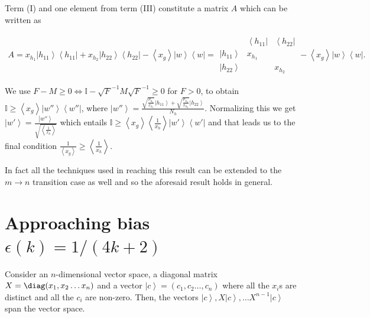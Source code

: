 \documentclass{article}
\begin{document}
Term (I) and one element from term (III) constitute a
matrix $A$ which can be written as \begin{small}
\begin{align*}
A  =x_{h_{1}}\left|h_{11}\right\rangle \left\langle h_{11}\right|+x_{h_{2}}\left|h_{22}\right\rangle \left\langle h_{22}\right|-\left\langle x_{g}\right\rangle \left|w\right\rangle \left\langle w\right| =\begin{array}{c|cc}
& \left\langle h_{11}\right| & \left\langle h_{22}\right|\\
\hline \left|h_{11}\right\rangle  & x_{h_{1}}\\
\left|h_{22}\right\rangle  &  & x_{h_{2}}
\end{array}-\left\langle x_{g}\right\rangle \left|w\right\rangle \left\langle w\right|.
\end{align*}
\end{small}
We use 
$F-M\ge0\iff\mathbb{I}-\sqrt{F}^{-1}M\sqrt{F}^{-1}\ge0$ for $F>0$, to obtain $\mathbb{I}\ge\left\langle x_{g}\right\rangle \left|w''\right\rangle \left\langle w''\right|$,
where $\left|w''\right\rangle =\frac{\sqrt{\frac{p_{h_{1}}}{x_{h_{1}}}}\left|h_{11}\right\rangle +\sqrt{\frac{p_{h_{2}}}{x_{h_{2}}}}\left|h_{22}\right\rangle }{N_{h}}$.
Normalizing this we get $\left|w'\right\rangle =\frac{\left|w''\right\rangle }{\sqrt{\left\langle \frac{1}{x_{h}}\right\rangle }}$
which entails $\mathbb{I}\ge\left\langle x_{g}\right\rangle \left\langle \frac{1}{x_{h}}\right\rangle \left|w'\right\rangle \left\langle w'\right|$
and that leads us to the final condition 
$
\frac{1}{\left\langle x_{g}\right\rangle }\ge\left\langle \frac{1}{x_{h}}\right\rangle .
$

In fact all the techniques used in reaching this result can be extended
to the $m\to n$ transition case as well and so the aforesaid result
holds in general.



\section{Approaching bias  \texorpdfstring{$\epsilon(k)=1/(4k+2)$}{epsilon(k)=1/(4k+2)}}
\label{sec:appendalgebraicanalytic}
\begin{lemma}
	\label{lem:spanningLemma}Consider an $n$-dimensional vector space, a diagonal matrix $X=\diag(x_{1},x_{2}\dots x_{n})$ and a vector
	$\left|c\right\rangle =(c_{1},c_{2}\dots,c_{n})$ where all the $x_{i}$s
	are distinct and all the $c_{i}$ are non-zero. Then, the vectors $\left|c\right\rangle ,X\left|c\right\rangle ,\dots X^{n-1}\left|c\right\rangle $
	span the vector space.
\end{lemma}
\end{document}
